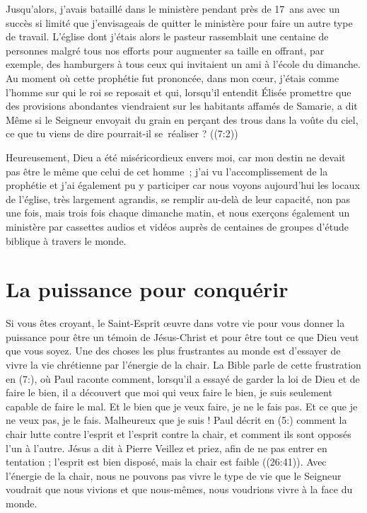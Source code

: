 Jusqu'alors, j'avais bataillé dans le ministère pendant près de 17~ans
 avec un succès si limité que j'envisageais de quitter le ministère
 pour faire un autre type de travail.
 L'église dont j'étais alors le pasteur rassemblait une centaine de personnes
 malgré tous nos efforts pour augmenter sa taille en offrant, par exemple, des hamburgers
 à tous ceux qui invitaient un ami à l'école du dimanche.
 Au moment où cette prophétie fut prononcée, dans mon cœur, j'étais comme l'homme
 sur qui le roi se reposait et qui, lorsqu'il entendit Élisée promettre
 que des provisions abondantes viendraient sur les habitants affamés
 de Samarie, a dit\frcolon{}
 \Og Même si le Seigneur envoyait du grain en perçant des trous dans
 la voûte du ciel, ce que tu viens de dire pourrait-il se~réaliser ? \Fg{}
 ((7:2))

Heureusement, Dieu a été miséricordieux envers moi,
 car mon destin ne devait pas être le même que celui de cet homme~;
 j'ai vu l'ac\-com\-plis\-sement de la prophétie et j'ai également pu y participer
 car nous voyons aujourd'hui les locaux de l'église, très largement agrandis,
 se remplir au-delà de leur capacité, non pas une fois, mais trois fois
 chaque dimanche matin, et nous exerçons également un ministère
 par cassettes audios et vidéos auprès de centaines de groupes
 d'étude biblique à travers le monde.

\section{La puissance pour conqu\'erir}

Si vous êtes croyant, le Saint-Esprit œuvre dans votre vie pour vous donner
 la puissance pour être un témoin de Jésus-Christ et pour être tout
 ce que Dieu veut que vous soyez.
 Une des choses les plus frustrantes au monde est d'essayer
 de vivre la vie chrétienne par l'énergie de la chair.
 La Bible parle de cette frustration en (7:),
 où Paul raconte comment, lors\-qu'il a essayé de garder la loi de Dieu
 et de faire le bien, il a découvert que \Og moi qui veux faire le bien,
 je suis seulement capable de faire le mal. Et le bien que je veux faire,
 je ne le fais pas. Et ce que je ne veux pas, je le fais.
 Malheureux que je suis ! \Fg{}
 Paul décrit en (5:) comment la chair lutte contre l'esprit
 et l'esprit contre la chair, et comment ils sont opposés l'un à l'autre.
 Jésus a dit à Pierre\frcolon{}
 \Og Veillez et priez, afin de ne pas entrer en tentation ;
 l'esprit est bien disposé, mais la chair est faible \Fg{}
 ((26:41)).
 Avec l'énergie de la chair, nous ne pouvons pas vivre
 le type de vie que le Seigneur voudrait que nous vivions
 et que nous-mêmes, nous voudrions vivre à la face du monde.

